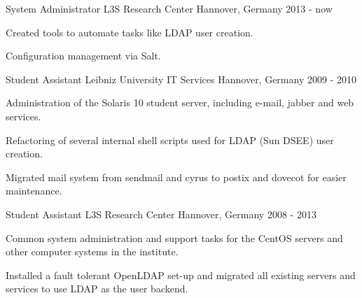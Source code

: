 

\begin{cventries}

  \cventry
    {System Administrator} %
    {L3S Research Center} %
    {Hannover, Germany} %
    {2013 - now} %
    {
      \begin{cvitems} %
        \item {Created tools to automate tasks like LDAP user creation.}
        \item {Configuration management via Salt.}
      \end{cvitems}
    }

  \cventry
    {Student Assistant} %
    {Leibniz University IT Services} %
    {Hannover, Germany} %
    {2009 - 2010} %
    {
      \begin{cvitems} %
        \item {Administration of the Solaris 10 student server, including e-mail, jabber and web services.}
	\item {Refactoring of several internal shell scripts used for LDAP (Sun DSEE) user creation.}
	\item {Migrated mail system from sendmail and cyrus to postix and dovecot for easier maintenance.}
      \end{cvitems} 
    }
    
  \cventry
    {Student Assistant} %
    {L3S Research Center} %
    {Hannover, Germany} %
    {2008 - 2013} %
    {
      \begin{cvitems} %
	\item {Common system administration and support tasks for the CentOS servers and other computer systems in the institute.}
        \item {Installed a fault tolerant OpenLDAP set-up and migrated all existing servers and services to use LDAP as the user backend.}
      \end{cvitems}
    }

\end{cventries}

